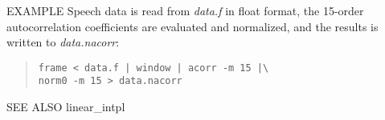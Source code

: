 \begin{options}
\end{options}

\begin{qsection}{EXAMPLE}
Speech data is read from {\em data.f} in float format,
the 15-order autocorrelation coefficients are evaluated
and normalized, and the results is written to {\em data.nacorr}:
\begin{quote}
  \verb!frame < data.f | window | acorr -m 15 |\ !\\
  \verb!norm0 -m 15 > data.nacorr!
\end{quote}
\end{qsection}

\begin{qsection}{SEE ALSO}
 linear\_intpl
\end{qsection}
